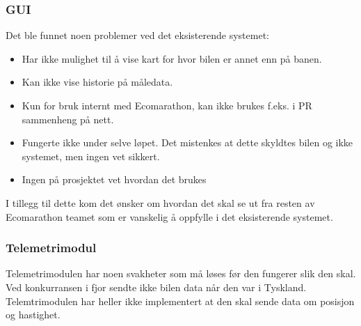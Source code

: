 \subsubsection{GUI}
Det ble funnet noen problemer ved det eksisterende systemet:
\begin{itemize}
\item Har ikke mulighet til å vise kart for hvor bilen er annet enn på banen.
\item Kan ikke vise historie på måledata.
\item Kun for bruk internt med Ecomarathon, kan ikke brukes f.eks. i PR sammenheng på nett.
\item Fungerte ikke under selve løpet. Det mistenkes at dette skyldtes bilen og ikke systemet, men ingen vet sikkert.
\item Ingen på prosjektet vet hvordan det brukes
\end{itemize}
I tillegg til dette kom det ønsker om hvordan det skal se ut fra resten av Ecomarathon teamet som er vanskelig å oppfylle i det eksisterende systemet.
\subsubsection{Telemetrimodul}
Telemetrimodulen har noen svakheter som må løses før den fungerer slik den skal.
Ved konkurransen i fjor sendte ikke bilen data når den var i Tyskland.
Telemtrimodulen har heller ikke implementert at den skal sende data om posisjon og hastighet.
